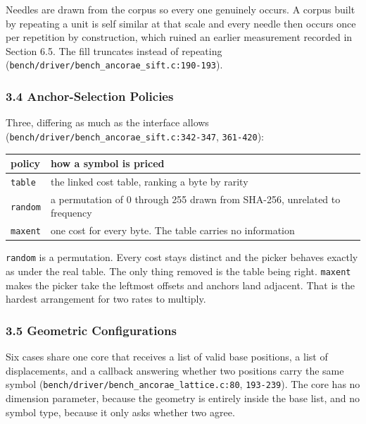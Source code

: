 Needles are drawn from the corpus so every one genuinely occurs. A corpus built by repeating a unit is self similar at that scale and every needle then occurs once per repetition by construction, which ruined an earlier measurement recorded in Section 6.5. The fill truncates instead of repeating (\texttt{bench/\allowbreak{}driver/\allowbreak{}bench\_\allowbreak{}ancorae\_\allowbreak{}sift.\allowbreak{}c:190-\allowbreak{}193}).

\subsubsection{3.4 Anchor-Selection Policies}

Three, differing as much as the interface allows (\texttt{bench/\allowbreak{}driver/\allowbreak{}bench\_\allowbreak{}ancorae\_\allowbreak{}sift.\allowbreak{}c:342-\allowbreak{}347}, \texttt{361-\allowbreak{}420}):

\tiny
\setlength{\tabcolsep}{2pt}
\begin{longtable}{@{}>{\raggedright\arraybackslash}p{}>{\raggedright\arraybackslash}p{}@{}}
\toprule
policy & how a symbol is priced \\
\midrule
\texttt{table} & the linked cost table, ranking a byte by rarity \\
\texttt{random} & a permutation of 0 through 255 drawn from SHA-256, unrelated to frequency \\
\texttt{maxent} & one cost for every byte. The table carries no information \\
\bottomrule
\end{longtable}
\normalsize

\texttt{random} is a permutation. Every cost stays distinct and the picker behaves exactly as under the real table. The only thing removed is the table being right. \texttt{maxent} makes the picker take the leftmost offsets and anchors land adjacent. That is the hardest arrangement for two rates to multiply.

\subsubsection{3.5 Geometric Configurations}

Six cases share one core that receives a list of valid base positions, a list of displacements, and a callback answering whether two positions carry the same symbol (\texttt{bench/\allowbreak{}driver/\allowbreak{}bench\_\allowbreak{}ancorae\_\allowbreak{}lattice.\allowbreak{}c:80}, \texttt{193-\allowbreak{}239}). The core has no dimension parameter, because the geometry is entirely inside the base list, and no symbol type, because it only asks whether two agree.

